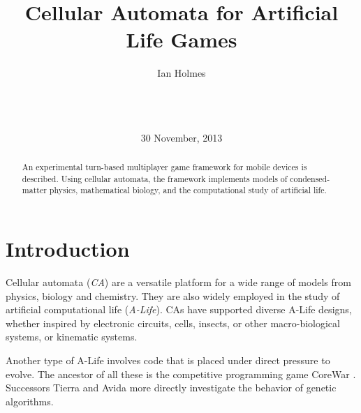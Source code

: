 \documentclass{acm_proc_article-sp}
\begin{document}
\title{Cellular Automata for Artificial Life Games}
\author{
\alignauthor
Ian Holmes\\
       \\
       \\
       \\
}
\date{30 November, 2013}

\maketitle
\begin{abstract}
An experimental turn-based multiplayer game framework for mobile devices is described.
Using cellular automata, the framework implements models
of condensed-matter physics, mathematical biology,
and the computational study of artificial life.
\end{abstract}



\section{Introduction}

Cellular automata ({\em CA}) are a versatile platform for a wide
range of models from physics, biology and chemistry\cite{Schiff2007}.
They are also widely employed in the study of artificial computational life ({\em A-Life}).
CAs have supported diverse A-Life designs,
whether inspired by electronic circuits\cite{VonNeumannBook,Wireworld},
cells, insects, or other macro-biological systems\cite{ConwaysLife,Langton1986},
or kinematic systems\cite{Stevens2011}.

Another type of A-Life involves code that is placed under direct pressure to evolve.
The ancestor of all these is the competitive programming game CoreWar
\cite{CoreWarGuidelines84,BarkleyWaitSchmidtCoreWar2004}.
Successors Tierra\cite{Tierra} and Avida\cite{Avida} more directly investigate the
behavior of genetic algorithms.
\end{document}
